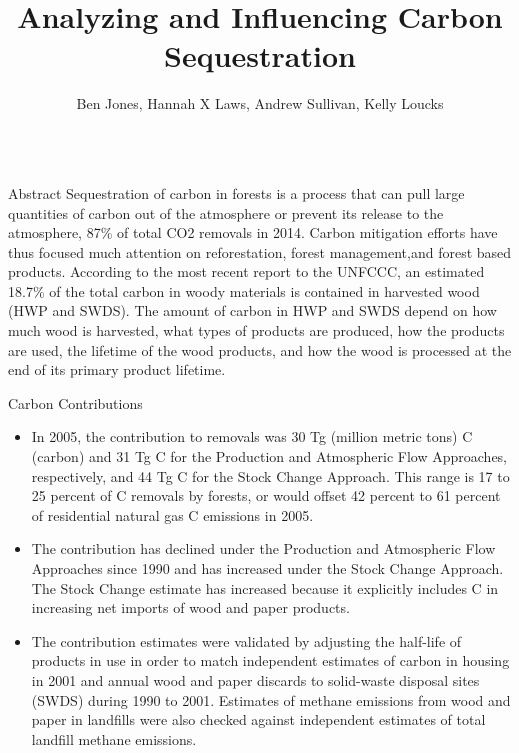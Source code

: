 \documentclass[final]{beamer}\usepackage[]{graphicx}\usepackage[]{color}
\title{Analyzing and Influencing Carbon Sequestration}
\author{Ben Jones, Hannah X Laws, Andrew Sullivan, Kelly Loucks}
\institute{Department of Mathematical Sciences}
\begin{document}
\begin{frame}[fragile]
\vspace{-2ex}
\begin{columns}[t]





\begin{column}{0.23\linewidth}
\begin{minipage}[t][.955\textheight]{\linewidth} 

\vspace{0ex}
\begin{block}{Abstract}
Sequestration of carbon in forests is a process that can pull large quantities of carbon out of the atmosphere or prevent its release to the atmosphere, 87\% of total CO2 removals in 2014. Carbon mitigation efforts have thus focused much attention on reforestation, forest management,and forest based products.  According to the most recent report to the UNFCCC, an estimated 18.7\% of the total carbon in woody materials is contained in harvested wood (HWP and SWDS).  
\vspace{2ex}
The amount of carbon in HWP and SWDS depend on how much wood is harvested, what types of products are produced, how the products are used, the lifetime of the wood products, and how the wood is processed at the end of its primary product lifetime.

\vspace{0ex}
\end{block}
\vfill

\begin{block}{Carbon Contributions}
\begin{itemize}
\item In 2005, the contribution to removals was 30 Tg (million metric tons) C (carbon) and 31 Tg C for the Production and Atmospheric Flow Approaches, respectively, and 44 Tg C for the Stock Change Approach. This range is 17 to 25 percent of C removals by forests, or would offset 42 percent to 61 percent of residential natural gas C emissions in 2005. 
\vspace{1ex}
\item The contribution has declined under the Production and Atmospheric Flow Approaches since 1990 and has increased under the Stock Change Approach. The Stock Change estimate has increased because it explicitly includes C in increasing net imports of wood and paper products. 
\vspace{1ex}
\item The contribution estimates were validated by adjusting the half-life of products in use in order to match independent estimates of carbon in housing in 2001 and annual wood and paper discards to solid-waste disposal sites (SWDS) during 1990 to 2001. Estimates of methane emissions from wood and paper in landfills were also checked against independent estimates of total landfill methane emissions. 


\end{itemize}
\end{block}
\end{minipage}
\end{column}
\end{columns}
\end{frame}
\end{document}
